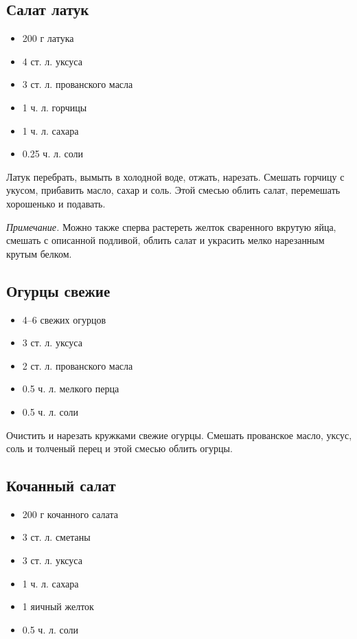\subsection{Салат латук}\label{1latuk}

\begin{itemize}
	\item 200 г латука 
    \item 4 ст. л. уксуса 
    \item 3 ст. л. прованского масла 
    \item 1 ч. л. горчицы 
    \item 1 ч. л. сахара 
    \item 0.25 ч. л. соли
\end{itemize}

Латук перебрать, вымыть в холодной воде, отжать, нарезать. Смешать горчицу с укусом, прибавить масло, сахар и соль. Этой смесью облить салат, перемешать хорошенько и подавать.

\emph{Примечание.} Можно также сперва растереть желток сваренного вкрутую яйца, смешать с описанной подливой, облить салат и украсить мелко нарезанным крутым белком.

\subsection{Огурцы свежие}

\begin{itemize}
	\item 4–6 свежих огурцов 
    \item 3 ст. л. уксуса 
    \item 2 ст. л. прованского масла 
    \item 0.5 ч. л. мелкого перца 
    \item 0.5 ч. л. соли
\end{itemize}

Очистить и нарезать кружками свежие огурцы. Смешать прованское масло, уксус, соль и толченый перец и этой смесью облить огурцы.

\subsection{Кочанный салат}

\begin{itemize}
	\item 200 г кочанного салата 
    \item 3 ст. л. сметаны 
    \item 3 ст. л. уксуса 
    \item 1 ч. л. сахара 
    \item 1 яичный желток 
    \item 0.5 ч. л. соли
\end{itemize}

